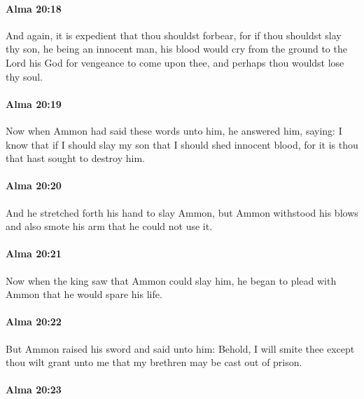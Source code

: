 		\paragraph{Alma 20:18} %
			\label{ALMA-20-18}

			And again, it is expedient that thou shouldst forbear,
			for if thou shouldst slay thy son, he being an innocent man,
			his blood would cry from the ground to the Lord his God
			for vengeance to come upon thee,
			and perhaps thou wouldst lose thy soul.

		\paragraph{Alma 20:19} %
			\label{ALMA-20-19}

			Now when Ammon had said these words unto him,
			he answered him, saying:
			I know that if I should slay my son that I should shed innocent blood,
			for it is thou that hast sought to destroy him.

		\paragraph{Alma 20:20} %
			\label{ALMA-20-20}

			And he stretched forth his hand to slay Ammon,
			but Ammon withstood his blows
			and also smote his arm that he could not use it.

		\paragraph{Alma 20:21} %
			\label{ALMA-20-21}

			Now when the king saw that Ammon could slay him,
			he began to plead with Ammon that he would spare his life.

		\paragraph{Alma 20:22} %
			\label{ALMA-20-22}

			But Ammon raised his sword and said unto him:
			Behold, I will smite thee except thou wilt grant unto me
			that my brethren may be cast out of prison.

		\paragraph{Alma 20:23} %
			\label{ALMA-20-23}

